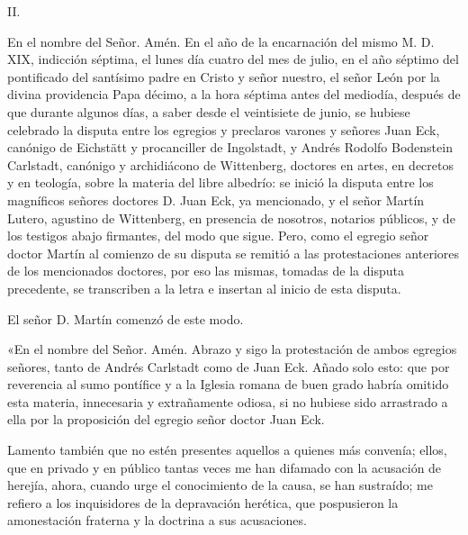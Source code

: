II.

En el nombre del Señor. Amén. En el año de la encarnación del mismo M. D. XIX, indicción séptima, el lunes día cuatro del mes de julio, en el año séptimo del pontificado del santísimo padre en Cristo y señor nuestro, el señor León por la divina providencia Papa décimo, a la hora séptima antes del mediodía, después de que durante algunos días, a saber desde el veintisiete de junio, se hubiese celebrado la disputa entre los egregios y preclaros varones y señores Juan Eck, canónigo de Eichstätt y procanciller de Ingolstadt, y Andrés Rodolfo Bodenstein Carlstadt, canónigo y archidiácono de Wittenberg, doctores en artes, en decretos y en teología, sobre la materia del libre albedrío: se inició la disputa entre los magníficos señores doctores D. Juan Eck, ya mencionado, y el señor Martín Lutero, agustino de Wittenberg, en presencia de nosotros, notarios públicos, y de los testigos abajo firmantes, del modo que sigue. Pero, como el egregio señor doctor Martín al comienzo de su disputa se remitió a las protestaciones anteriores de los mencionados doctores, por eso las mismas, tomadas de la disputa precedente, se transcriben a la letra e insertan al inicio de esta disputa.

El señor D. Martín comenzó de este modo.

«En el nombre del Señor. Amén. Abrazo y sigo la protestación de ambos egregios señores, tanto de Andrés Carlstadt como de Juan Eck. Añado solo esto: que por reverencia al sumo pontífice y a la Iglesia romana de buen grado habría omitido esta materia, innecesaria y extrañamente odiosa, si no hubiese sido arrastrado a ella por la proposición del egregio señor doctor Juan Eck.

Lamento también que no estén presentes aquellos a quienes más convenía; ellos, que en privado y en público tantas veces me han difamado con la acusación de herejía, ahora, cuando urge el conocimiento de la causa, se han sustraído; me refiero a los inquisidores de la depravación herética, que pospusieron la amonestación fraterna y la doctrina a sus acusaciones.

